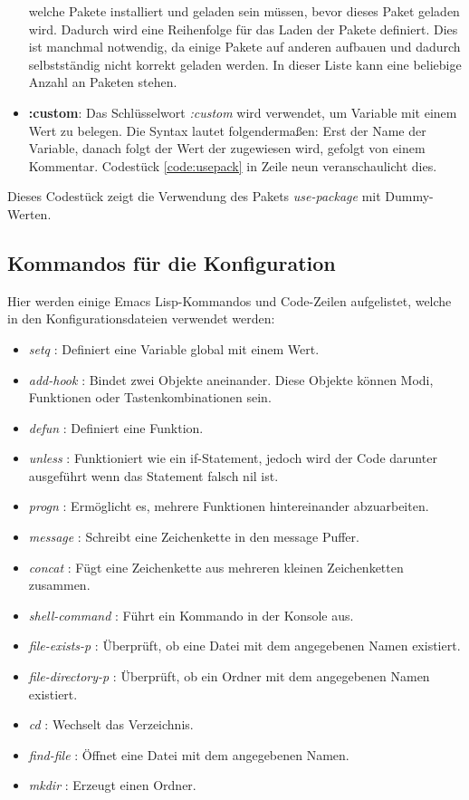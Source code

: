 \begin{itemize}
  welche Pakete installiert und geladen sein müssen, bevor dieses
  Paket geladen wird. Dadurch wird eine Reihenfolge für das Laden der
  Pakete definiert. Dies ist manchmal notwendig, da einige Pakete auf
  anderen aufbauen und dadurch selbstständig nicht korrekt geladen
  werden. In dieser Liste kann eine beliebige Anzahl an Paketen
  stehen.
\item \textbf{:custom}: Das Schlüsselwort \textit{:custom} wird
  verwendet, um Variable mit einem Wert zu belegen. Die Syntax lautet
  folgendermaßen: Erst der Name der Variable, danach folgt der Wert
  der zugewiesen wird, gefolgt von einem Kommentar. Codestück
  \ref{code:usepack} in Zeile neun veranschaulicht dies.
\end{itemize}

\begin{program}[h]
  
  \caption{\label{code:usepack}Dieses Codestück zeigt die Verwendung
    des Pakets \textit{use-package} mit {\glqq}Dummy{\grqq}-Werten.}
\end{program}

\subsection{Kommandos für die Konfiguration}
\label{subsec:kommandosKonfig}
Hier werden einige Emacs Lisp-Kommandos und Code-Zeilen aufgelistet,
welche in den Konfigurationsdateien verwendet werden:
\begin{itemize}
\item \textit{setq} : Definiert eine Variable global mit einem Wert.
\item \textit{add-hook} : Bindet zwei Objekte aneinander. Diese
  Objekte können Modi, Funktionen oder Tastenkombinationen sein.
\item \textit{defun} : Definiert eine Funktion.
\item \textit{unless} : Funktioniert wie ein if-Statement, jedoch wird
  der Code darunter ausgeführt wenn das Statement falsch
  {\glqq}nil{\grqq} ist.
\item \textit{progn} : Ermöglicht es, mehrere Funktionen
  hintereinander abzuarbeiten.
\item \textit{message} : Schreibt eine Zeichenkette in den
  {\glqq}message{\grqq} Puffer.
\item \textit{concat} : Fügt eine Zeichenkette aus mehreren kleinen
  Zeichenketten zusammen.
\item \textit{shell-command} : Führt ein Kommando in der Konsole aus.
\item \textit{file-exists-p} : Überprüft, ob eine Datei mit dem
  angegebenen Namen existiert.
\item \textit{file-directory-p} : Überprüft, ob ein Ordner mit dem
  angegebenen Namen existiert.
\item \textit{cd} : Wechselt das Verzeichnis.
\item \textit{find-file} : Öffnet eine Datei mit dem angegebenen
  Namen.
\item \textit{mkdir} : Erzeugt einen Ordner.
\end{itemize}

